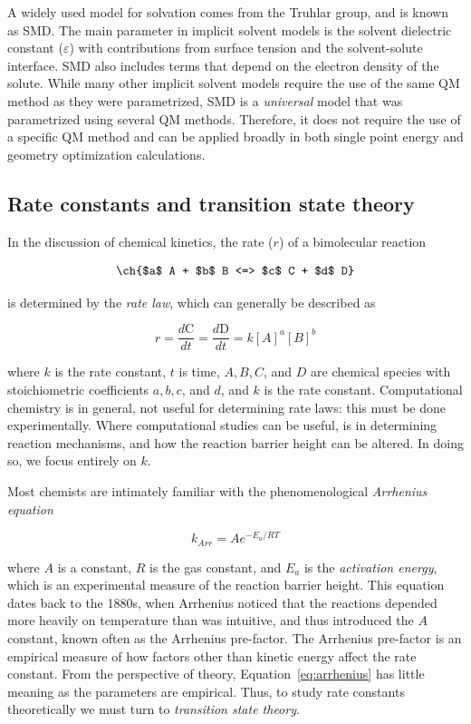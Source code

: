 A widely used model for solvation comes from the Truhlar group, and is known as
SMD.\cite{Marenich2009} The main parameter in implicit solvent models is the
solvent dielectric constant ($\varepsilon$) with contributions from surface
tension and the solvent-solute interface. SMD also includes terms that depend
on the electron density of the solute.  While many other implicit solvent
models require the use of the same QM method as they were
parametrized,\cite{Ho2010} SMD is a \emph{universal} model that was
parametrized using several QM methods. Therefore, it does not require the use
of a specific QM method and can be applied broadly in both single point energy
and geometry optimization calculations.

\subsection{Rate constants and transition state theory}

In the discussion of chemical kinetics, the rate ($r$) of a bimolecular
reaction

\begin{equation}
  \ch{$a$ A + $b$ B <=> $c$ C + $d$ D}
  \label{eq:a}
\end{equation}

\noindent is determined by the \emph{rate law}, which can generally be
described as

\begin{equation}
  r = \frac{d \text{C}}{dt} =\frac{d \text{D}}{dt} = k[A]^a [B]^b
\end{equation}

\noindent where $k$ is the rate constant, $t$ is time, $A, B, C$, and $D$ are
chemical species with stoichiometric coefficients $a, b, c$, and $d$, and $k$
is the rate constant. Computational chemistry is in general, not useful for
determining rate laws: this must be done experimentally. Where computational
studies can be useful, is in determining reaction mechanisms, and how the
reaction barrier height can be altered. In doing so, we focus entirely on $k$.

Most chemists are intimately familiar with the phenomenological \emph{Arrhenius
equation}

\begin{equation}
  k_{Arr} = Ae^{-E_a/RT}
\label{eq:arrhenius}
\end{equation}

\noindent where $A$ is a constant, $R$ is the gas constant, and $E_a$ is the
\emph{activation energy}, which is an experimental measure of the reaction
barrier height. This equation dates back to the 1880s, when Arrhenius noticed
that the reactions depended more heavily on temperature than was intuitive, and
thus introduced the $A$ constant, known often as the Arrhenius
pre-factor.\cite{McQuarrie1997} The Arrhenius pre-factor is an empirical
measure of how factors other than kinetic energy affect the rate constant. From
the perspective of theory, Equation~\ref{eq:arrhenius} has little meaning as
the parameters are empirical. Thus, to study rate constants theoretically we
must turn to \emph{transition state theory}.

